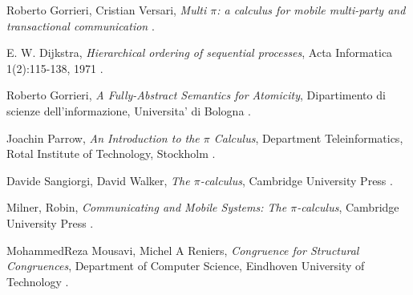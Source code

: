 \begin{thebibliography}{99}

  Roberto Gorrieri, Cristian Versari,
  \emph{Multi $\pi$: a calculus for mobile multi-party and transactional communication}
  .

  E. W. Dijkstra,
  \emph{Hierarchical ordering of sequential processes},
  Acta Informatica 1(2):115-138, 
  1971
  .


  Roberto Gorrieri,
  \emph{A Fully-Abstract Semantics for Atomicity},
  Dipartimento di scienze dell'informazione, 
  Universita' di Bologna
  .


  Joachin Parrow, 
  \emph{An Introduction to the $\pi$ Calculus},
  Department Teleinformatics,
  Rotal Institute of Technology,
  Stockholm
  .


  Davide Sangiorgi, David Walker,
  \emph{The $\pi$-calculus},
  Cambridge University Press
  .


  Milner, Robin, 
  \emph{Communicating and Mobile Systems: The $\pi$-calculus},
  Cambridge University Press
  .

  MohammedReza Mousavi, Michel A Reniers,
  \emph{Congruence for Structural Congruences},
  Department of Computer Science,
  Eindhoven University of Technology
  .

\end{thebibliography}
